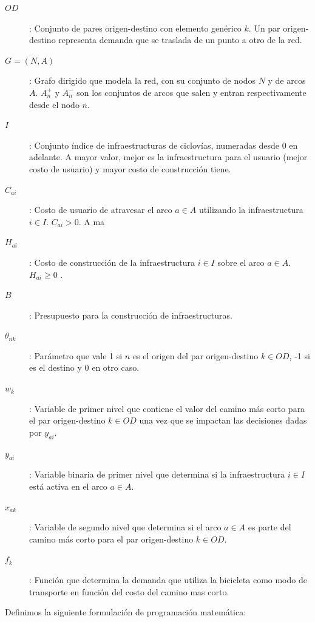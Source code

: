 \documentclass{article}
\begin{document}
  \begin{description}
    \item[$OD$]: Conjunto de pares origen-destino con elemento genérico $k$. Un par origen-destino representa demanda que se traslada de un punto a otro de la red.
    \item[$G=(N,A)$]: Grafo dirigido que modela la red, con su conjunto de nodos $N$ y de arcos $A$. $A_n^+$ y $A_n^-$ son los conjuntos de arcos que salen y entran respectivamente desde el nodo $n$.
    \item[$I$]: Conjunto índice de infraestructuras de ciclovías, numeradas desde $0$ en adelante. A mayor valor, mejor es la infraestructura para el usuario (mejor costo de usuario) y mayor costo de construcción tiene.
    \item[$C_{ai}$]: Costo de usuario de atravesar el arco $a \in A$ utilizando la infraestructura $i \in I$. $C_{ai} > 0$. A ma
    \item[$H_{ai}$]: Costo de construcción de la infraestructura $i \in I$ sobre el arco $a \in A$. $H_{ai} \geq 0$ .
    \item[$B$]: Presupuesto para la construcción de infraestructuras.
    \item[$\theta_{nk}$]: Parámetro que vale 1 si $n$ es el origen del par origen-destino $k \in OD$, -1 si es el destino y 0 en otro caso.
    \item[$w_k$]: Variable de primer nivel que contiene el valor del camino más corto para el par origen-destino $k \in OD$ una vez que se impactan las decisiones dadas por $y_{ai}$.
    \item[$y_{ai}$]: Variable binaria de primer nivel que determina si la infraestructura $i \in I$ está activa en el arco $a \in A$.
    \item[$x_{ak}$]: Variable de segundo nivel que determina si el arco $a \in A$ es parte del camino más corto para el par origen-destino $k \in OD$.
    \item[$f_k$]: Función que determina la demanda que utiliza la bicicleta como modo de transporte en función del costo del camino mas corto.
  \end{description}

  Definimos la siguiente formulación de programación matemática:
\end{document}
